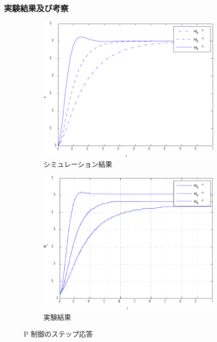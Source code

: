 \subsubsection{実験結果及び考察}
\begin{figure}[H]
    \centering
    \begin{subfigure}[b]{0.45\linewidth}
        \centering
        \includegraphics[width=\linewidth]{figure/sim_P-crop.pdf}
        \caption{シミュレーション結果}
    \end{subfigure}
    \hfill
    \begin{subfigure}[b]{0.45\linewidth}
        \centering
        \includegraphics[width=\linewidth]{figure/plot_figure-crop.pdf}
        \caption{実験結果}
    \end{subfigure}
    \caption{P 制御のステップ応答}
    \label{fig:step_response}
\end{figure}


